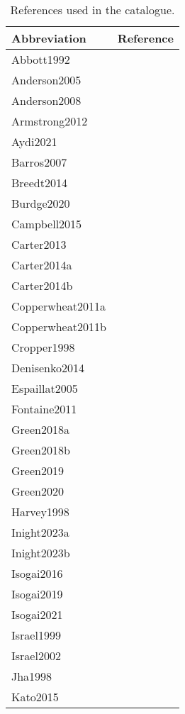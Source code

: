 \documentclass[fleqn,usenatbib]{mnras}
\begin{document}
\begin{table}
\caption{References used in the catalogue.}
\begin{tabular}{lc}
Abbreviation & Reference\\
\hline
Abbott1992 & \citet{Abbott1992}\\
Anderson2005 & \citet{Anderson2005}\\
Anderson2008 & \citet{Anderson2008}\\
Armstrong2012 & \citet{Armstrong2012}\\
Aydi2021 & \citet{Aydi2021}\\
Barros2007 & \citet{Barros2007}\\
Breedt2014 & \citet{Breedt2014}\\
Burdge2020 & \citet{Burdge2020}\\
Campbell2015 & \citet{Campbell2015}\\
Carter2013 & \citet{Carter2013}\\
Carter2014a & \citet{Carter2014a}\\
Carter2014b & \citet{Carter2014b}\\
Copperwheat2011a & \citet{Copperwheat2011a}\\
Copperwheat2011b & \citet{Copperwheat2011b}\\
Cropper1998 & \citet{Cropper1998}\\
Denisenko2014 & \citet{Denisenko2014}\\
Espaillat2005 & \citet{Espaillat2005}\\
Fontaine2011 & \citet{Fontaine2011}\\
Green2018a & \citet{Green2018a}\\
Green2018b & \citet{Green2018b}\\
Green2019 & \citet{Green2019}\\
Green2020 & \citet{Green2020}\\
Harvey1998 & \citet{Harvey1998}\\
Inight2023a & \citet{Inight2023a}\\
Inight2023b & \citet{Inight2023b}\\
Isogai2016 & \citet{Isogai2016}\\
Isogai2019 & \citet{Isogai2019}\\
Isogai2021 & \citet{Isogai2021}\\
Israel1999 & \citet{Israel1999}\\
Israel2002 & \citet{Israel2002}\\
Jha1998 & \citet{Jha1998}\\
Kato2015 & \citet{Kato2015}\\

\end{tabular}
\end{table}
\end{document}
